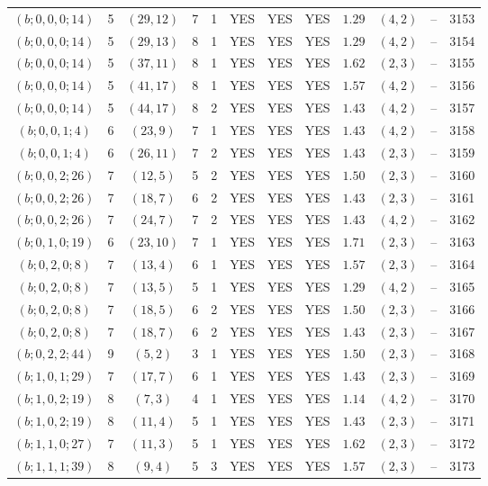 \begin{longtable}{|c|c|c|c|c|c|c|c|c|c|c|c|}
$(b;0,0,0;14)$ & 5 & $(29,12)$ & 7 & 1 & YES & YES & YES & $1.29$ & $(4,2)$ & -- & 3153\\
$(b;0,0,0;14)$ & 5 & $(29,13)$ & 8 & 1 & YES & YES & YES & $1.29$ & $(4,2)$ & -- & 3154\\
$(b;0,0,0;14)$ & 5 & $(37,11)$ & 8 & 1 & YES & YES & YES & $1.62$ & $(2,3)$ & -- & 3155\\
$(b;0,0,0;14)$ & 5 & $(41,17)$ & 8 & 1 & YES & YES & YES & $1.57$ & $(4,2)$ & -- & 3156\\
$(b;0,0,0;14)$ & 5 & $(44,17)$ & 8 & 2 & YES & YES & YES & $1.43$ & $(4,2)$ & -- & 3157\\
$(b;0,0,1;4)$ & 6 & $(23,9)$ & 7 & 1 & YES & YES & YES & $1.43$ & $(4,2)$ & -- & 3158\\
$(b;0,0,1;4)$ & 6 & $(26,11)$ & 7 & 2 & YES & YES & YES & $1.43$ & $(2,3)$ & -- & 3159\\
$(b;0,0,2;26)$ & 7 & $(12,5)$ & 5 & 2 & YES & YES & YES & $1.50$ & $(2,3)$ & -- & 3160\\
$(b;0,0,2;26)$ & 7 & $(18,7)$ & 6 & 2 & YES & YES & YES & $1.43$ & $(2,3)$ & -- & 3161\\
$(b;0,0,2;26)$ & 7 & $(24,7)$ & 7 & 2 & YES & YES & YES & $1.43$ & $(4,2)$ & -- & 3162\\
$(b;0,1,0;19)$ & 6 & $(23,10)$ & 7 & 1 & YES & YES & YES & $1.71$ & $(2,3)$ & -- & 3163\\
$(b;0,2,0;8)$ & 7 & $(13,4)$ & 6 & 1 & YES & YES & YES & $1.57$ & $(2,3)$ & -- & 3164\\
$(b;0,2,0;8)$ & 7 & $(13,5)$ & 5 & 1 & YES & YES & YES & $1.29$ & $(4,2)$ & -- & 3165\\
$(b;0,2,0;8)$ & 7 & $(18,5)$ & 6 & 2 & YES & YES & YES & $1.50$ & $(2,3)$ & -- & 3166\\
$(b;0,2,0;8)$ & 7 & $(18,7)$ & 6 & 2 & YES & YES & YES & $1.43$ & $(2,3)$ & -- & 3167\\
$(b;0,2,2;44)$ & 9 & $(5,2)$ & 3 & 1 & YES & YES & YES & $1.50$ & $(2,3)$ & -- & 3168\\
$(b;1,0,1;29)$ & 7 & $(17,7)$ & 6 & 1 & YES & YES & YES & $1.43$ & $(2,3)$ & -- & 3169\\
$(b;1,0,2;19)$ & 8 & $(7,3)$ & 4 & 1 & YES & YES & YES & $1.14$ & $(4,2)$ & -- & 3170\\
$(b;1,0,2;19)$ & 8 & $(11,4)$ & 5 & 1 & YES & YES & YES & $1.43$ & $(2,3)$ & -- & 3171\\
$(b;1,1,0;27)$ & 7 & $(11,3)$ & 5 & 1 & YES & YES & YES & $1.62$ & $(2,3)$ & -- & 3172\\
$(b;1,1,1;39)$ & 8 & $(9,4)$ & 5 & 3 & YES & YES & YES & $1.57$ & $(2,3)$ & -- & 3173\\

\end{longtable}
